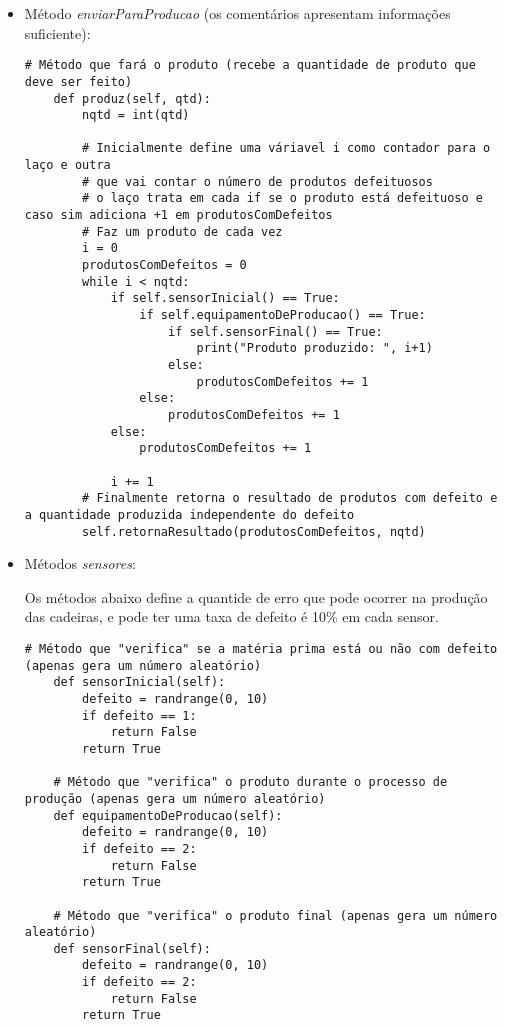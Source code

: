 \documentclass[brazil, a4paper,12pt]{article}
\begin{document}
\begin{enumerate}
\begin{itemize}

\item Método \emph{enviarParaProducao} (os comentários apresentam informações suficiente):

\begin{lstlisting}[style=sd]
# Método que fará o produto (recebe a quantidade de produto que deve ser feito)
    def produz(self, qtd):
        nqtd = int(qtd)

        # Inicialmente define uma váriavel i como contador para o laço e outra
        # que vai contar o número de produtos defeituosos
        # o laço trata em cada if se o produto está defeituoso e caso sim adiciona +1 em produtosComDefeitos
        # Faz um produto de cada vez
        i = 0
        produtosComDefeitos = 0
        while i < nqtd:
            if self.sensorInicial() == True:
                if self.equipamentoDeProducao() == True:
                    if self.sensorFinal() == True:
                        print("Produto produzido: ", i+1)
                    else:
                        produtosComDefeitos += 1
                else:
                    produtosComDefeitos += 1
            else:
                produtosComDefeitos += 1

            i += 1
        # Finalmente retorna o resultado de produtos com defeito e a quantidade produzida independente do defeito
        self.retornaResultado(produtosComDefeitos, nqtd)

\end{lstlisting}

\item Métodos \emph{sensores}:

Os métodos abaixo define a quantide de erro que pode ocorrer na produção das cadeiras, e pode ter uma taxa de defeito é 10\% em cada sensor.

\begin{lstlisting}[style=sd]
# Método que "verifica" se a matéria prima está ou não com defeito (apenas gera um número aleatório)
    def sensorInicial(self):
        defeito = randrange(0, 10)
        if defeito == 1:
            return False
        return True

    # Método que "verifica" o produto durante o processo de produção (apenas gera um número aleatório)
    def equipamentoDeProducao(self):
        defeito = randrange(0, 10)
        if defeito == 2:
            return False
        return True

    # Método que "verifica" o produto final (apenas gera um número aleatório)
    def sensorFinal(self):
        defeito = randrange(0, 10)
        if defeito == 2:
            return False
        return True
        
\end{lstlisting}

\end{itemize}

\end{enumerate}
\end{document}

